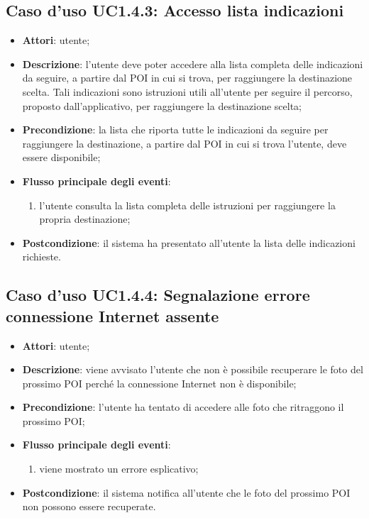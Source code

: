 \documentclass[../AnalisiDeiRequisiti.tex]{subfiles}
\begin{document}
\subsection{Caso d'uso UC1.4.3: Accesso lista indicazioni}
\begin{itemize}
	\item \textbf{Attori}: utente;
	\item \textbf{Descrizione}: l'utente deve poter accedere alla lista completa delle indicazioni da seguire, a partire dal POI in cui si trova, per raggiungere la destinazione scelta. Tali indicazioni sono istruzioni utili all'utente per seguire il percorso, proposto dall'applicativo, per raggiungere la destinazione scelta; 
	\item \textbf{Precondizione}: la lista che riporta tutte le indicazioni da seguire per raggiungere la destinazione, a partire dal POI in cui si trova l'utente, deve essere disponibile;
	
	\item \textbf{Flusso principale degli eventi}:
	\begin{enumerate}
		\item l'utente consulta la lista completa delle istruzioni per raggiungere la propria destinazione;
		
	\end{enumerate}
	\item \textbf{Postcondizione}: il sistema ha presentato all'utente la lista delle indicazioni richieste.
\end{itemize}
\hypertarget{UC1.4.4}{}
\subsection{Caso d'uso UC1.4.4: Segnalazione errore connessione Internet assente}
\begin{itemize}
	\item \textbf{Attori}: utente;
	\item \textbf{Descrizione}: viene avvisato l'utente che non è possibile recuperare le foto del prossimo POI perché la connessione Internet non è disponibile; 
	\item \textbf{Precondizione}: l'utente ha tentato di accedere alle foto che ritraggono il prossimo POI;
	
	\item \textbf{Flusso principale degli eventi}:
	\begin{enumerate}
		\item viene mostrato un errore esplicativo;
		
	\end{enumerate}
	\item \textbf{Postcondizione}: il sistema notifica all'utente che le foto del prossimo POI non possono essere recuperate.
\end{itemize}
\hypertarget{UC1.5}{}
\end{document}
